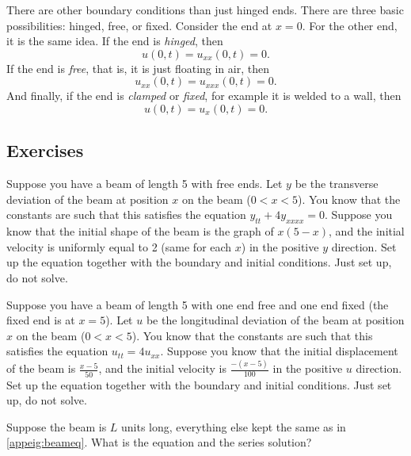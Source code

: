 There are other boundary conditions than just hinged ends.  There are
three basic possibilities: hinged, free, or fixed.  Consider
the end at $x=0$.  For the other end, it is the same idea.
If the end is \emph{hinged}, then
\begin{equation*}
u(0,t) = u_{xx}(0,t) = 0 .
\end{equation*}
If the end is \emph{free}, that is, it is just
floating in air, then
\begin{equation*}
u_{xx}(0,t) = u_{xxx}(0,t) = 0 .
\end{equation*}
And finally, if the end is
\emph{clamped}
or  
\emph{fixed}, for example it is welded to a
wall,
then
\begin{equation*}
u(0,t) = u_{x}(0,t) = 0 .
\end{equation*}


\subsection{Exercises}

\begin{exercise}
Suppose you have a beam of length 5 with free ends.  Let $y$ be the
transverse deviation of the beam at position $x$ on the beam ($0 < x < 5$).
You know that the
constants are such that this satisfies the equation $y_{tt} + 4 y_{xxxx} =
0$.   Suppose you know that the initial shape of the beam is the graph of
$x(5-x)$, and the initial velocity is uniformly equal to 2 (same for each $x$)
in the positive $y$ direction.  Set up the equation together with the
boundary and initial conditions.  Just set up, do not solve.
\end{exercise}

\begin{exercise}
Suppose you have a beam of length 5 with one end free and one end fixed
(the fixed end is at $x=5$).
Let $u$ be the
longitudinal deviation of the beam at position $x$ on the beam ($0 < x < 5$).
You know that the
constants are such that this satisfies the equation $u_{tt} = 4 u_{xx}$.
Suppose you know that the initial displacement of the beam
is $\frac{x-5}{50}$, and the initial velocity is $\frac{-(x-5)}{100}$
in the positive $u$ direction.  Set up the equation together with the
boundary and initial conditions.  Just set up, do not solve.
\end{exercise}

\begin{exercise}
Suppose the beam is $L$ units long, everything else kept the same
as in \eqref{appeig:beameq}.  What is the equation and the series
solution?
\end{exercise}

